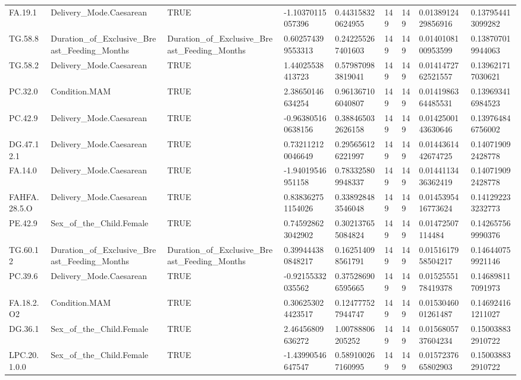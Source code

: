 \begin{longtable}{lllllllll}
FA.19.1 & Delivery\_Mode.Caesarean & TRUE & -1.10370115057396 & 0.443158320624955 & 149 & 149 & 0.0138912429856916 & 0.137954413099282 \\
TG.58.8 & Duration\_of\_Exclusive\_Breast\_Feeding\_Months & Duration\_of\_Exclusive\_Breast\_Feeding\_Months & 0.602574399553313 & 0.242255267401603 & 149 & 149 & 0.0140108100953599 & 0.138707019944063 \\
TG.58.2 & Delivery\_Mode.Caesarean & TRUE & 1.44025538413723 & 0.579870983819041 & 149 & 149 & 0.0141472762521557 & 0.139621717030621 \\
PC.32.0 & Condition.MAM & TRUE & 2.38650146634254 & 0.961367106040807 & 149 & 149 & 0.0141986364485531 & 0.139693416984523 \\
PC.42.9 & Delivery\_Mode.Caesarean & TRUE & -0.963805160638156 & 0.388465032626158 & 149 & 149 & 0.0142500143630646 & 0.139764846756002 \\
DG.47.12.1 & Delivery\_Mode.Caesarean & TRUE & 0.732112120046649 & 0.295656126221997 & 149 & 149 & 0.0144361442674725 & 0.140719092428778 \\
FA.14.0 & Delivery\_Mode.Caesarean & TRUE & -1.94019546951158 & 0.783325809948337 & 149 & 149 & 0.0144113436362419 & 0.140719092428778 \\
FAHFA.28.5.O & Delivery\_Mode.Caesarean & TRUE & 0.838362751154026 & 0.338928483546048 & 149 & 149 & 0.0145395416773624 & 0.141292233232773 \\
PE.42.9 & Sex\_of\_the\_Child.Female & TRUE & 0.745928623042902 & 0.302137655084824 & 149 & 149 & 0.01472507114484 & 0.142657569990376 \\
TG.60.12 & Duration\_of\_Exclusive\_Breast\_Feeding\_Months & Duration\_of\_Exclusive\_Breast\_Feeding\_Months & 0.399444380848217 & 0.162514098561791 & 149 & 149 & 0.0151617958504217 & 0.146440759921146 \\
PC.39.6 & Delivery\_Mode.Caesarean & TRUE & -0.92155332035562 & 0.375286906595665 & 149 & 149 & 0.0152555178419378 & 0.146898117091973 \\
FA.18.2.O2 & Condition.MAM & TRUE & 0.306253024423517 & 0.124777527944747 & 149 & 149 & 0.0153046001261487 & 0.146924161211027 \\
DG.36.1 & Sex\_of\_the\_Child.Female & TRUE & 2.46456809636272 & 1.00788806205252 & 149 & 149 & 0.0156805737604234 & 0.150038832910722 \\
LPC.20.1.0.0 & Sex\_of\_the\_Child.Female & TRUE & -1.43990546647547 & 0.589100267160995 & 149 & 149 & 0.0157237665802903 & 0.150038832910722 \\

\end{longtable}
